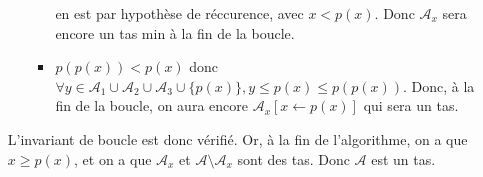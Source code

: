 \begin{itemize}
\begin{itemize}[label=$\star$]
\begin{itemize}[label = $\circ$]
{} en est par hypothèse de réccurence, avec $x < p(x)$. Donc $\mathcal A_x$ sera encore un tas min à la fin de la boucle.
			
			\item $p(p(x)) < p(x)$ donc $\forall y \in \mathcal A_1 \cup \mathcal A_2 \cup \mathcal A_3 \cup \{p(x)\}, y \leq p(x) \leq p(p(x))$. Donc, à la fin de la boucle, on aura encore $\mathcal A_x[x \gets p(x)]$ qui sera un tas.
	

		\end{itemize}
		
	\end{itemize}
	L'invariant de boucle est donc vérifié. Or, à la fin de l'algorithme, on a que $ x \geq p(x)$, et on a que $\mathcal A_x$ et $\mathcal A \setminus \mathcal A_x$ sont des tas. Donc $\mathcal A$ est un tas.
\end{itemize}

